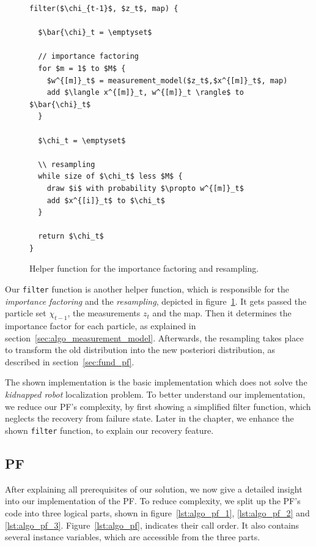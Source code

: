 \begin{figure}
\begin{lstlisting}[mathescape]
filter($\chi_{t-1}$, $z_t$, map) {
  
  $\bar{\chi}_t = \emptyset$

  // importance factoring
  for $m = 1$ to $M$ {
    $w^{[m]}_t$ = measurement_model($z_t$,$x^{[m]}_t$, map)
    add $\langle x^{[m]}_t, w^{[m]}_t \rangle$ to $\bar{\chi}_t$
  }
  
  $\chi_t = \emptyset$
  
  \\ resampling
  while size of $\chi_t$ less $M$ {
    draw $i$ with probability $\propto w^{[m]}_t$
    add $x^{[i]}_t$ to $\chi_t$
  }
  
  return $\chi_t$
}		
\end{lstlisting}
\caption{Helper function for the importance factoring and resampling.}
\label{lst:pf_filter}
\end{figure}

Our \texttt{filter} function is another helper function, which is responsible for the \emph{importance factoring} and the \emph{resampling}, depicted in figure~\ref{lst:pf_filter}. It gets passed the particle set $\chi_{t-1}$, the measurements $z_t$ and the map. Then it determines the importance factor for each particle, as explained in section~\ref{sec:algo_measurement_model}. Afterwards, the resampling takes place to transform the old distribution into the new posteriori distribution, as described in section~\ref{sec:fund_pf}.

 The shown implementation is the basic implementation which does not solve the \emph{kidnapped robot} localization problem. To better understand our implementation, we reduce our \acs{PF}'s complexity, by first showing a simplified filter function, which neglects the recovery from failure state. Later in the chapter, we enhance the shown \texttt{filter} function, to explain our recovery feature. 

\subsection{\acl{PF}}
After explaining all prerequisites of our solution, we now give a detailed insight into our implementation of the \acl{PF}. To reduce complexity, we split up the \acs{PF}'s code into three logical parts, shown in figure~\ref{lst:algo_pf_1}, \ref{lst:algo_pf_2} and \ref{lst:algo_pf_3}. Figure~\ref{lst:algo_pf}, indicates their call order. It also contains several instance variables, which are accessible from the three parts.



